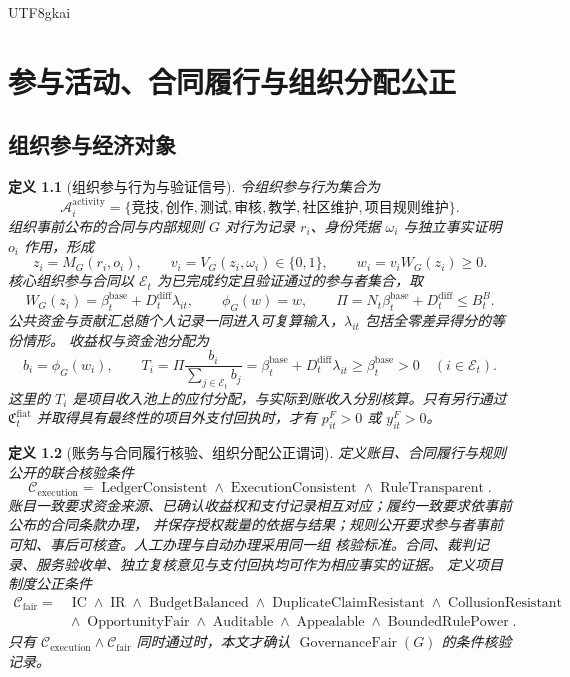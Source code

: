 \documentclass[12pt,a4paper,openany]{report}
\newtheorem{definition}{定义}[chapter]
\newcommand{\Act}{\mathcal A}
\DeclareMathOperator{\Auditable}{Auditable}
\DeclareMathOperator{\Appealable}{Appealable}
\DeclareMathOperator{\BudgetBalanced}{BudgetBalanced}
\DeclareMathOperator{\IC}{IC}
\DeclareMathOperator{\IR}{IR}
\DeclareMathOperator{\DuplicateClaimResistant}{DuplicateClaimResistant}
\DeclareMathOperator{\CollusionResistant}{CollusionResistant}
\DeclareMathOperator{\OpportunityFair}{OpportunityFair}
\DeclareMathOperator{\RuleTransparent}{RuleTransparent}
\DeclareMathOperator{\LedgerConsistent}{LedgerConsistent}
\DeclareMathOperator{\ExecutionConsistent}{ExecutionConsistent}
\DeclareMathOperator{\GovernanceFair}{GovernanceFair}
\begin{document}
\begin{CJK*}{UTF8}{gkai}
\chapter{参与活动、合同履行与组织分配公正}
\label{chap:activity-governance}

\section{组织参与经济对象}

\begin{definition}[组织参与行为与验证信号]
令组织参与行为集合为
\[
  \Act_i^{\mathrm{activity}}
  =
  \{\text{竞技},\text{创作},\text{测试},\text{审核},
    \text{教学},\text{社区维护},\text{项目规则维护}\}.
\]
组织事前公布的合同与内部规则 \(G\) 对行为记录 \(r_i\)、身份凭据 \(\omega_i\) 与独立事实证明 \(o_i\) 作用，形成
\[
  z_i=M_G(r_i,o_i),\qquad
  v_i=V_G(z_i,\omega_i)\in\{0,1\},
\qquad
  w_i=v_iW_G(z_i)\ge0.
\]
核心组织参与合同以 \(\mathcal E_t\) 为已完成约定且验证通过的参与者集合，取
\[
  W_G(z_i)=\beta_t^{\mathrm{base}}+D_t^{\mathrm{diff}}\lambda_{it},
  \qquad \phi_G(w)=w,\qquad
  \Pi=N_t\beta_t^{\mathrm{base}}+D_t^{\mathrm{diff}}\le B_t^B.
\]
公共资金与贡献汇总随个人记录一同进入可复算输入，\(\lambda_{it}\) 包括全零差异得分的等份情形。
收益权与资金池分配为
\[
  b_i=\phi_G(w_i),\qquad
  T_i=
  \Pi\frac{b_i}{\sum_{j\in\mathcal E_t}b_j}
  =\beta_t^{\mathrm{base}}+D_t^{\mathrm{diff}}\lambda_{it}
  \ge\beta_t^{\mathrm{base}}>0
  \quad(i\in\mathcal E_t).
\]
这里的 \(T_i\) 是项目收入池上的应付分配，与实际到账收入分别核算。只有另行通过
\(\mathfrak C_t^{\mathrm{fiat}}\) 并取得具有最终性的项目外支付回执时，才有
\(p_{it}^{F}>0\) 或 \(y_{it}^{F}>0\)。
\end{definition}

\begin{definition}[账务与合同履行核验、组织分配公正谓词]
定义账目、合同履行与规则公开的联合核验条件
\[
  \mathcal C_{\mathrm{execution}}
  =
  \LedgerConsistent
  \wedge
  \ExecutionConsistent
  \wedge
  \RuleTransparent.
\]
账目一致要求资金来源、已确认收益权和支付记录相互对应；履约一致要求依事前公布的合同条款办理，
并保存授权裁量的依据与结果；规则公开要求参与者事前可知、事后可核查。人工办理与自动办理采用同一组
核验标准。合同、裁判记录、服务验收单、独立复核意见与支付回执均可作为相应事实的证据。
定义项目制度公正条件
\[
\begin{aligned}
  \mathcal C_{\mathrm{fair}}
  ={}&
  \IC\wedge\IR\wedge\BudgetBalanced
  \wedge\DuplicateClaimResistant\wedge\CollusionResistant\\
  &{}\wedge\OpportunityFair
  \wedge\Auditable\wedge\Appealable
  \wedge\operatorname{BoundedRulePower}.
\end{aligned}
\]
只有 \(\mathcal C_{\mathrm{execution}}\wedge\mathcal C_{\mathrm{fair}}\) 同时通过时，本文才确认
\(\GovernanceFair(G)\) 的条件核验记录。
\end{definition}


\end{CJK*}
\end{document}
